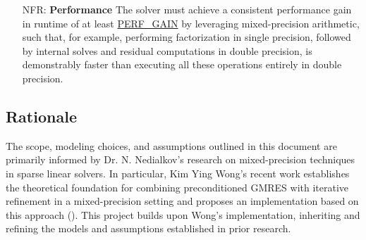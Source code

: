 \documentclass[12pt]{article}
\newcounter{nfrnum} %
\begin{document}
\begin{itemize}

\item[NFR\refstepcounter{nfrnum}\thenfrnum \label{NFR:perf}:] \textbf{Performance} The
  solver must achieve a consistent performance gain in runtime of at least
  \hyperref[tab:const]{PERF\_GAIN} by leveraging mixed-precision arithmetic,
  such that, for example, performing factorization in single precision, followed
  by internal solves and residual computations in double precision, is
  demonstrably faster than executing all these operations entirely in double
  precision.


\end{itemize}

\subsection{Rationale}


The scope, modeling choices, and assumptions outlined in this document are
primarily informed by Dr. N. Nedialkov's research on mixed-precision techniques
in sparse linear solvers. In particular, Kim Ying Wong's recent work establishes
the theoretical foundation for combining preconditioned GMRES with iterative
refinement in a mixed-precision setting and proposes an implementation based on
this approach (\cite{wong_exploring_2024}). This project builds upon Wong’s
implementation, inheriting and refining the models and assumptions established
in prior research.
\end{document}
